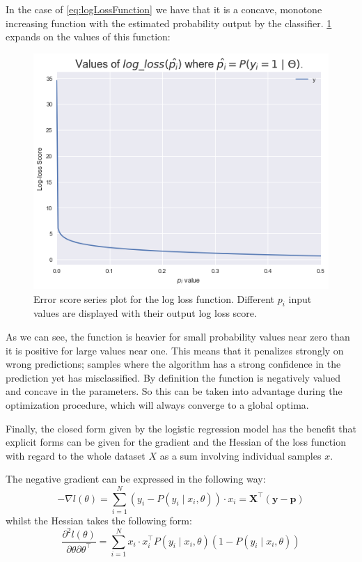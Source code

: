 In the case of \cref{eq:logLossFunction} we have that it is a concave, monotone increasing function with the estimated probability output by the classifier.
\cref{figure-logLossValues} expands on the values of this function:

\begin{figure}[h!]
\begin{center}
\includegraphics[width=0.7\columnwidth]{figures/logloss/figure-logLossValues.png}
\caption{ Error score series plot for the log loss function.
Different $p_i$ input values are displayed with their output log loss score.}
\label{figure-logLossValues}
\end{center}
\end{figure}

As we can see, the function is heavier for small probability values near zero than it is positive for large values near one.
This means that it penalizes strongly on wrong predictions; samples where the algorithm has a strong confidence in the prediction yet has misclassified.
By definition the function is negatively valued and concave in the parameters.
So this can be taken into advantage during the optimization procedure, which will always converge to a global optima.

Finally, the closed form given by the logistic regression model has the benefit that explicit forms can be given for the gradient and the Hessian of the loss function with regard to the whole dataset $X$ as a sum involving individual samples $x$.

The negative gradient can be expressed in the following way: %
\begin{equation}
- \nabla l(\theta) = \sum_{i=1}^N (y_i - P(y_i \mid x_i,\theta))\cdot x_i = \textbf{X}^{\intercal}(\textbf{y}-\textbf{p})
\label{eq:logitHessian1}
\end{equation}
whilst the Hessian takes the following form:
\begin{equation}
\frac{\partial^2 l(\theta)}{\partial \theta \partial \theta^\intercal} = \sum_{i=1}^N x_i \cdot x_i^\intercal P(y_i \mid x_i,\theta)(1 -P(y_i \mid x_i,\theta))
\label{eq:logitHessian2}
\end{equation}

